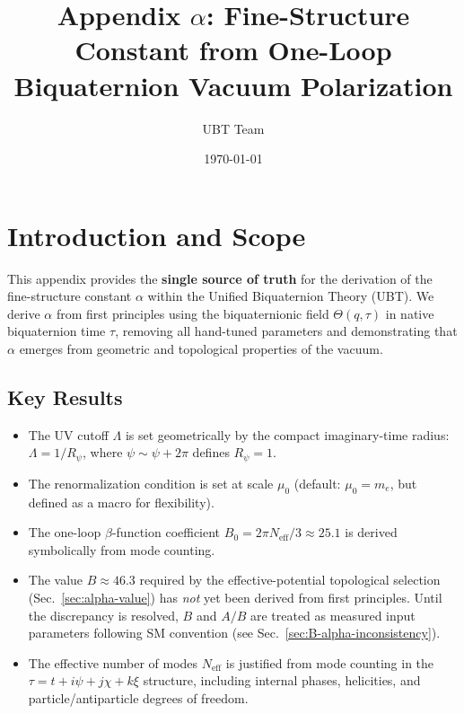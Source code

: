 \documentclass[11pt,a4paper]{article}
\title{Appendix $\alpha$: Fine-Structure Constant from One-Loop Biquaternion Vacuum Polarization}
\author{UBT Team}
\date{\today}
\theoremstyle{remark}
\begin{document}
  \maketitle
\fi

\section{Introduction and Scope}
\label{sec:alpha-intro}

This appendix provides the \textbf{single source of truth} for the derivation of the fine-structure constant $\alpha$ within the Unified Biquaternion Theory (UBT). We derive $\alpha$ from first principles using the biquaternionic field $\Theta(q,\tau)$ in native biquaternion time $\tau$, removing all hand-tuned parameters and demonstrating that $\alpha$ emerges from geometric and topological properties of the vacuum.

\subsection{Key Results}

\begin{itemize}
\item The UV cutoff $\Lambda$ is set geometrically by the compact imaginary-time radius: $\Lambda = 1/R_\psi$, where $\psi \sim \psi + 2\pi$ defines $R_\psi = 1$.
\item The renormalization condition is set at scale $\mu_0$ (default: $\mu_0 = m_e$, but defined as a macro for flexibility).
\item The one-loop $\beta$-function coefficient $B_0 = 2\pi N_{\mathrm{eff}}/3 \approx 25.1$ is derived symbolically from mode counting.
\item The value $B \approx 46.3$ required by the effective-potential topological selection (Sec.~\ref{sec:alpha-value}) has \emph{not} yet been derived from first principles. Until the discrepancy is resolved, $B$ and $A/B$ are treated as measured input parameters following SM convention (see Sec.~\ref{sec:B-alpha-inconsistency}).
\item The effective number of modes $N_{\text{eff}}$ is justified from mode counting in the $\tau = t + i\psi + j\chi + k\xi$ structure, including internal phases, helicities, and particle/antiparticle degrees of freedom.
\end{itemize}
\end{document}
